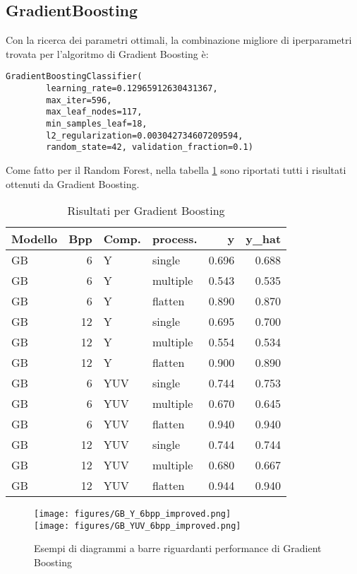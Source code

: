 \subsection{GradientBoosting}
Con la ricerca dei parametri ottimali, la combinazione migliore di iperparametri trovata per l'algoritmo di Gradient Boosting è:
\begin{lstlisting}[style=pythonElegant]
    GradientBoostingClassifier(
        learning_rate=0.12965912630431367, 
        max_iter=596, 
        max_leaf_nodes=117,
        min_samples_leaf=18, 
        l2_regularization=0.003042734607209594,
        random_state=42, validation_fraction=0.1)
\end{lstlisting}
Come fatto per il Random Forest, nella tabella \ref{tab:GB-results-table} sono riportati tutti i risultati ottenuti da Gradient Boosting.
\begin{table}[H]
\centering
\caption{Risultati per Gradient Boosting}
\label{tab:GB-results-table}
\begin{tabular}{lrllrr}
\toprule
Modello &  Bpp &  Comp. &     process. &     y &  y\_hat \\
\midrule
GB &  6 &       Y &   single & 0.696 &  0.688 \\
GB &  6 &       Y & multiple & 0.543 &  0.535 \\
GB &  6 &       Y & flatten & 0.890 & 0.870 \\
GB & 12 &       Y &   single & 0.695 &  0.700 \\
GB & 12 &       Y & multiple & 0.554 &  0.534 \\
GB & 12 &       Y & flatten & 0.900 & 0.890 \\
\midrule
GB &  6 &     YUV &   single & 0.744 &  0.753 \\
GB &  6 &     YUV & multiple & 0.670 &  0.645 \\
GB &  6 &     YUV &  flatten & 0.940 &  0.940 \\
GB & 12 &     YUV &   single & 0.744 &  0.744 \\
GB & 12 &     YUV & multiple & 0.680 &  0.667 \\
GB & 12 &     YUV &  flatten & 0.944 &  0.940 \\
\bottomrule
\end{tabular}
\end{table}
\begin{figure}[H]
    \centering
    \texttt{[image: figures/GB\_Y\_6bpp\_improved.png]}\\[0.5cm]
    \texttt{[image: figures/GB\_YUV\_6bpp\_improved.png]}
    \caption{Esempi di diagrammi a barre riguardanti performance di Gradient Boosting}
    \label{fig:GB_YUV_plots}
\end{figure}
